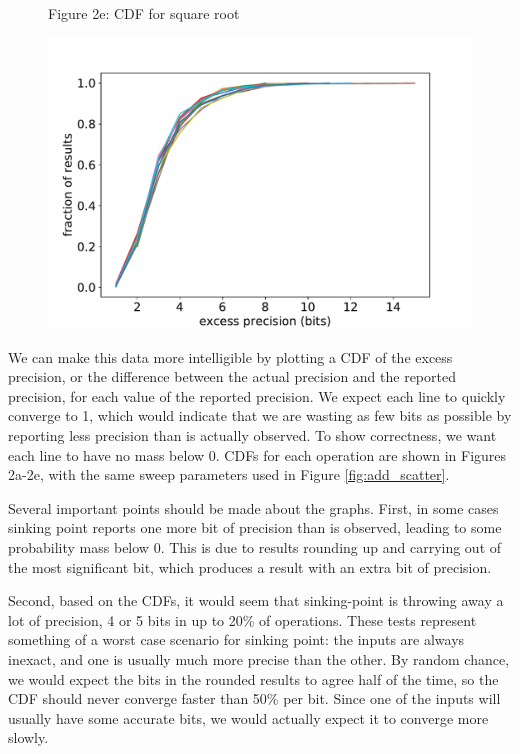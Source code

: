 \documentclass[letterpaper,10pt]{article}
\begin{document}
\begin{figure}
\begin{minipage}{1.2\textwidth}
 \begin{center}
 \begin{minipage}{0.6\textwidth}
  \begin{center} Figure 2e: CDF for square root \end{center} \vspace{-10pt}
  \includegraphics[width=1.0\textwidth]{sqrt_cdf.pdf}
 \end{minipage}
 \end{center}

\end{minipage}
\end{figure}

We can make this data more intelligible by plotting a CDF of the excess precision, or the difference between the actual precision and the reported precision, for each value of the reported precision. We expect each line to quickly converge to 1, which would indicate that we are wasting as few bits as possible by reporting less precision than is actually observed. To show correctness, we want each line to have no mass below 0. CDFs for each operation are shown in Figures 2a-2e, with the same sweep parameters used in Figure \ref{fig:add_scatter}.


Several important points should be made about the graphs. First, in some cases sinking point reports one more bit of precision than is observed, leading to some probability mass below 0. This is due to results rounding up and carrying out of the most significant bit, which produces a result with an extra bit of precision.

Second, based on the CDFs, it would seem that sinking-point is throwing away a lot of precision, 4 or 5 bits in up to 20\% of operations. These tests represent something of a worst case scenario for sinking point: the inputs are always inexact, and one is usually much more precise than the other. By random chance, we would expect the bits in the rounded results to agree half of the time, so the CDF should never converge faster than 50\% per bit. Since one of the inputs will usually have some accurate bits, we would actually expect it to converge more slowly.
\end{document}
